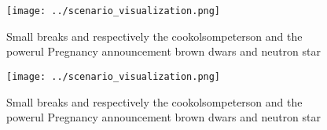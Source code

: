 \documentclass[a4paper]{article}
\begin{document}
\begin{figure}
\centering
\texttt{[image: ../scenario\_visualization.png]}
\caption{Small breaks and respectively the cookolsompeterson and the powerul Pregnancy announcement brown dwars and neutron star
}
\end{figure}
 
\begin{figure}
\centering
\texttt{[image: ../scenario\_visualization.png]}
\caption{Small breaks and respectively the cookolsompeterson and the powerul Pregnancy announcement brown dwars and neutron star
}
\end{figure}
 
\end{document}
